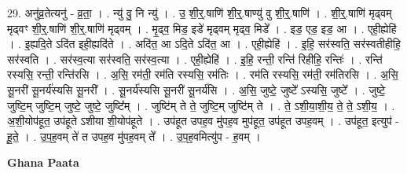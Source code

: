 \documentclass[17pt]{extarticle}
\begin{document}
29. अनु॑व्र॒तेत्यनु॑ - व्र॒ता॒ । . न्यु॑ वु॒ नि न्यु॑ । . उ॒ शी॒र्॒.षाणि॑ शी॒र्॒.षाण्यु॑ वु शी॒र्॒.षाणि॑ । . शी॒र्॒.षाणि॑ मृढ्वम् मृढ्वꣳ शी॒र्॒.षाणि॑ शी॒र्॒.षाणि॑ मृढ्वम् । . मृ॒ढ्व॒ मिड॒ इडे॑ मृढ्वम् मृढ्व॒ मिडे᳚ । . इड॒ एड॒ इड॒ आ । . एही॒ह्येहि॑ । . इ॒ह्यदि॒ते ऽदि॑त इही॒ह्यदि॑ते । . अदि॑त॒ आ ऽदि॒ते ऽदि॑त॒ आ । . एही॒ह्येहि॑ । . इ॒हि॒ सर॑स्वति॒ सर॑स्वतीहीहि॒ सर॑स्वति । . सर॑स्व॒त्या सर॑स्वति॒ सर॑स्व॒त्या । . एही॒ह्येहि॑ । . इ॒हि॒ रन्ती॒ रन्ति॑ रिहीहि॒ रन्तिः॑ । . रन्ति॑ रस्यसि॒ रन्ती॒ रन्ति॑रसि । . अ॒सि॒ रम॑ती॒ रम॑ति रस्यसि॒ रम॑तिः । . रम॑ति रस्यसि॒ रम॑ती॒ रम॑तिरसि । . अ॒सि॒ सू॒नरी॑ सू॒नर्य॑स्यसि सू॒नरी᳚ । . सू॒नर्य॑स्यसि सू॒नरी॑ सू॒नर्य॑सि । . अ॒सि॒ जुष्टे॒ जुष्टे᳚ ऽस्यसि॒ जुष्टे᳚ । . जुष्टे॒ जुष्टि॒म् जुष्टि॒म् जुष्टे॒ जुष्टे॒ जुष्टि᳚म् । . जुष्टि॑म् ते ते॒ जुष्टि॒म् जुष्टि॑म् ते । . ते॒ ऽशी॒या॒शी॒य॒ ते॒ ते॒ ऽशी॒य॒ । . अ॒शी॒योप॑हूत॒ उप॑हूते ऽशीया शी॒योप॑हूते । . उप॑हूत उपह॒व मु॑पह॒व मुप॑हूत॒ उप॑हूत उपह॒वम् । . उप॑हूत॒ इत्युप॑ - हू॒ते॒ । . उ॒प॒ह॒वम् ते॑ त उपह॒व मु॑पह॒वम् ते᳚ । . उ॒प॒ह॒वमित्यु॑प - ह॒वम् । \newline

\textbf{Ghana Paata } \newline
\end{document}
